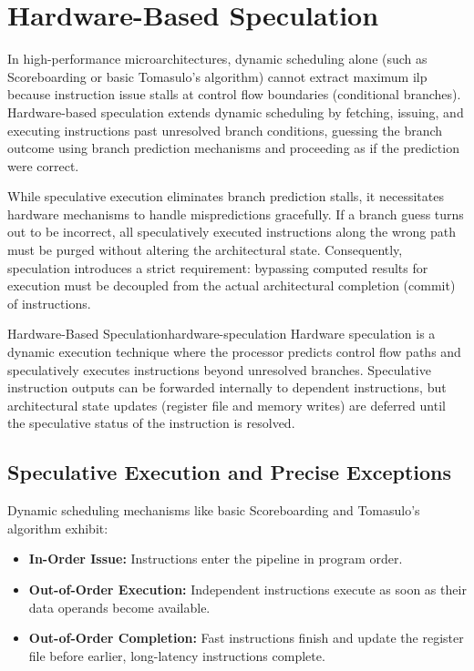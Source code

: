 \chapter{Hardware-Based Speculation}
\label{ch:hardware_speculation}

In high-performance microarchitectures, dynamic scheduling alone (such as Scoreboarding or basic Tomasulo's algorithm) cannot extract maximum \gls{ilp} because instruction issue stalls at control flow boundaries (conditional branches). Hardware-based speculation extends dynamic scheduling by fetching, issuing, and executing instructions past unresolved branch conditions, guessing the branch outcome using branch prediction mechanisms and proceeding as if the prediction were correct.

While speculative execution eliminates branch prediction stalls, it necessitates hardware mechanisms to handle mispredictions gracefully. If a branch guess turns out to be incorrect, all speculatively executed instructions along the wrong path must be purged without altering the architectural state. Consequently, speculation introduces a strict requirement: bypassing computed results for execution must be decoupled from the actual architectural completion (commit) of instructions.

\begin{definition}{Hardware-Based Speculation}{hardware-speculation}
    Hardware speculation is a dynamic execution technique where the processor predicts control flow paths and speculatively executes instructions beyond unresolved branches. Speculative instruction outputs can be forwarded internally to dependent instructions, but architectural state updates (register file and memory writes) are deferred until the speculative status of the instruction is resolved.
\end{definition}

\section{Speculative Execution and Precise Exceptions}

Dynamic scheduling mechanisms like basic Scoreboarding and Tomasulo's algorithm exhibit:
\begin{itemize}
    \item \textbf{In-Order Issue:} Instructions enter the pipeline in program order.
    \item \textbf{Out-of-Order Execution:} Independent instructions execute as soon as their data operands become available.
    \item \textbf{Out-of-Order Completion:} Fast instructions finish and update the register file before earlier, long-latency instructions complete.
\end{itemize}

